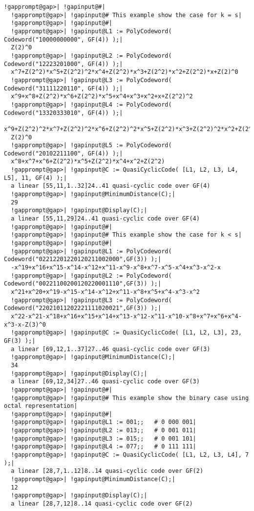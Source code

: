 \documentclass[a4paper,11pt]{report}
\begin{document}
{{ 
\begin{Verbatim}[commandchars=!@|,fontsize=\small,frame=single,label=Example]
  !gapprompt@gap>| !gapinput@#|
  !gapprompt@gap>| !gapinput@# This example show the case for k = s|
  !gapprompt@gap>| !gapinput@#|
  !gapprompt@gap>| !gapinput@L1 := PolyCodeword( Codeword("10000000000", GF(4)) );|
  Z(2)^0
  !gapprompt@gap>| !gapinput@L2 := PolyCodeword( Codeword("12223201000", GF(4)) );|
  x^7+Z(2^2)*x^5+Z(2^2)^2*x^4+Z(2^2)*x^3+Z(2^2)*x^2+Z(2^2)*x+Z(2)^0
  !gapprompt@gap>| !gapinput@L3 := PolyCodeword( Codeword("31111220110", GF(4)) );|
  x^9+x^8+Z(2^2)*x^6+Z(2^2)*x^5+x^4+x^3+x^2+x+Z(2^2)^2
  !gapprompt@gap>| !gapinput@L4 := PolyCodeword( Codeword("13320333010", GF(4)) );|
  x^9+Z(2^2)^2*x^7+Z(2^2)^2*x^6+Z(2^2)^2*x^5+Z(2^2)*x^3+Z(2^2)^2*x^2+Z(2^2)^2*x+\
  Z(2)^0
  !gapprompt@gap>| !gapinput@L5 := PolyCodeword( Codeword("20102211100", GF(4)) );|
  x^8+x^7+x^6+Z(2^2)*x^5+Z(2^2)*x^4+x^2+Z(2^2)
  !gapprompt@gap>| !gapinput@C := QuasiCyclicCode( [L1, L2, L3, L4, L5], 11, GF(4) );|
  a linear [55,11,1..32]24..41 quasi-cyclic code over GF(4)
  !gapprompt@gap>| !gapinput@MinimumDistance(C);|
  29
  !gapprompt@gap>| !gapinput@Display(C);|
  a linear [55,11,29]24..41 quasi-cyclic code over GF(4)
  !gapprompt@gap>| !gapinput@#|
  !gapprompt@gap>| !gapinput@# This example show the case for k < s|
  !gapprompt@gap>| !gapinput@#|
  !gapprompt@gap>| !gapinput@L1 := PolyCodeword( Codeword("02212201220120211002000",GF(3)) );|
  -x^19+x^16+x^15-x^14-x^12+x^11-x^9-x^8+x^7-x^5-x^4+x^3-x^2-x
  !gapprompt@gap>| !gapinput@L2 := PolyCodeword( Codeword("00221100200120220001110",GF(3)) );|
  x^21+x^20+x^19-x^15-x^14-x^12+x^11-x^8+x^5+x^4-x^3-x^2
  !gapprompt@gap>| !gapinput@L3 := PolyCodeword( Codeword("22021011202221111020021",GF(3)) );|
  x^22-x^21-x^18+x^16+x^15+x^14+x^13-x^12-x^11-x^10-x^8+x^7+x^6+x^4-x^3-x-Z(3)^0
  !gapprompt@gap>| !gapinput@C := QuasiCyclicCode( [L1, L2, L3], 23, GF(3) );|
  a linear [69,12,1..37]27..46 quasi-cyclic code over GF(3)
  !gapprompt@gap>| !gapinput@MinimumDistance(C);|
  34
  !gapprompt@gap>| !gapinput@Display(C);|
  a linear [69,12,34]27..46 quasi-cyclic code over GF(3)
  !gapprompt@gap>| !gapinput@#|
  !gapprompt@gap>| !gapinput@# This example show the binary case using octal representation|
  !gapprompt@gap>| !gapinput@#|
  !gapprompt@gap>| !gapinput@L1 := 001;;   # 0 000 001|
  !gapprompt@gap>| !gapinput@L2 := 013;;   # 0 001 011|
  !gapprompt@gap>| !gapinput@L3 := 015;;   # 0 001 101|
  !gapprompt@gap>| !gapinput@L4 := 077;;   # 0 111 111|
  !gapprompt@gap>| !gapinput@C := QuasiCyclicCode( [L1, L2, L3, L4], 7 );|
  a linear [28,7,1..12]8..14 quasi-cyclic code over GF(2)
  !gapprompt@gap>| !gapinput@MinimumDistance(C);|
  12
  !gapprompt@gap>| !gapinput@Display(C);|
  a linear [28,7,12]8..14 quasi-cyclic code over GF(2)
\end{Verbatim}
  

}}
\end{document}
